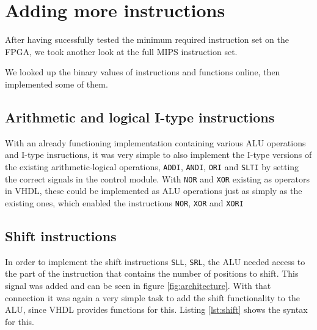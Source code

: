 \section{Adding more instructions}
\label{sec:more_instructions}
After having sucessfully tested the minimum required instruction set on the FPGA,
we took another look at the full MIPS instruction set.

We looked up the binary values of instructions and functions online\cite{bib:opencores},
then implemented some of them.

\subsection{Arithmetic and logical I-type instructions}
With an already functioning implementation containing various ALU operations and I-type insructions,
it was very simple to also implement the I-type versions of the existing arithmetic-logical operations, \texttt{ADDI}, \texttt{ANDI}, \texttt{ORI} and \texttt{SLTI} by setting the correct signals in the control module.
With \texttt{NOR} and \texttt{XOR} existing as operators in VHDL, these could be implemented as ALU operations just as simply as the existing ones,
which enabled the instructions \texttt{NOR}, \texttt{XOR} and \texttt{XORI}

\subsection{Shift instructions}
In order to implement the shift instructions \texttt{SLL}, \texttt{SRL},
the ALU needed access to the part of the instruction that contains the number of positions to shift.
This signal was added and can be seen in figure \ref{fig:architecture}.
With that connection it was again a very simple task to add the shift functionality to the ALU, since VHDL provides functions for this.
Listing \ref{lst:shift} shows the syntax for this.



